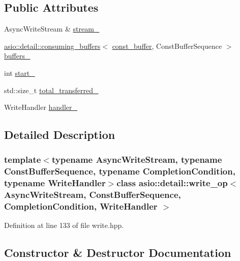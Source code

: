 \subsection*{Public Attributes}
\begin{DoxyCompactItemize}
\item 
Async\+Write\+Stream \& \hyperlink{classasio_1_1detail_1_1write__op_a9f06de304a3a9944f68dd494e777827b}{stream\+\_\+}
\item 
\hyperlink{classasio_1_1detail_1_1consuming__buffers}{asio\+::detail\+::consuming\+\_\+buffers}$<$ \hyperlink{classasio_1_1const__buffer}{const\+\_\+buffer}, Const\+Buffer\+Sequence $>$ \hyperlink{classasio_1_1detail_1_1write__op_a07e6662f88ca192db1446eebbcb77e3e}{buffers\+\_\+}
\item 
int \hyperlink{classasio_1_1detail_1_1write__op_abe9c4c673906b3a725db21a0089b0578}{start\+\_\+}
\item 
std\+::size\+\_\+t \hyperlink{classasio_1_1detail_1_1write__op_abda37e9a75c329b5c6c7ffa641b18d25}{total\+\_\+transferred\+\_\+}
\item 
Write\+Handler \hyperlink{classasio_1_1detail_1_1write__op_ae1b7226fd1d411ac3a126ca7698a81d9}{handler\+\_\+}
\end{DoxyCompactItemize}


\subsection{Detailed Description}
\subsubsection*{template$<$typename Async\+Write\+Stream, typename Const\+Buffer\+Sequence, typename Completion\+Condition, typename Write\+Handler$>$class asio\+::detail\+::write\+\_\+op$<$ Async\+Write\+Stream, Const\+Buffer\+Sequence, Completion\+Condition, Write\+Handler $>$}



Definition at line 133 of file write.\+hpp.



\subsection{Constructor \& Destructor Documentation}
\hypertarget{classasio_1_1detail_1_1write__op_a9e643cf38742b07da4dba17ae3338de3}{}
